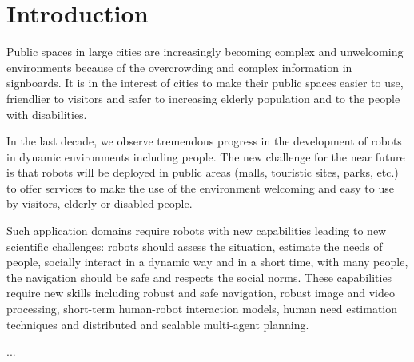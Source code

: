 \section{Introduction}
\label{sec:intro}

Public spaces in large cities are increasingly becoming complex and unwelcoming environments because of the overcrowding and complex information in signboards. It is in the interest of cities to make their public spaces easier to use, friendlier to visitors and safer to increasing elderly population and to the people with disabilities.

In the last decade, we observe tremendous progress in the development of robots in dynamic environments %
including people. The new challenge for the near future is that robots will be deployed in public areas (malls, touristic sites, parks, etc.) to offer services to make the use of the environment welcoming and easy to use by visitors, elderly or disabled people. 

Such application domains require robots with new capabilities leading to new scientific challenges: robots should assess the situation, estimate the needs of people, socially interact in a dynamic way and in a short time, with many people, the navigation should be safe and respects the social norms. These capabilities require new skills including robust and safe navigation, robust image and video processing, short-term human-robot interaction models, human need estimation techniques and distributed and scalable multi-agent planning.

...


